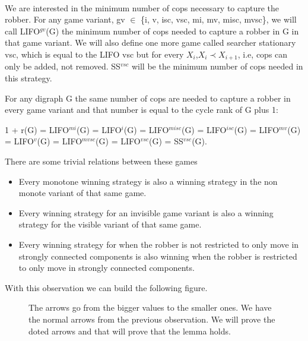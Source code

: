 \paragraph{}
We are interested in the minimum number of cops necessary to capture the robber. For any game variant, gv $\in$ \{i, v, isc, vsc, mi, mv, misc, mvsc\}, we will call LIFO$^{gv}$(G) the minimum number of cops needed to capture a robber in G in that game variant. We will also define one more game called searcher stationary vsc, which is equal to the LIFO vsc but for every $X_i$,$X_i \prec X_{i+1}$, i.e, cops can only be added, not removed. SS$^{vsc}$ will be the minimum number of cops needed in this strategy.

\begin{theorem}
For any digraph G the same number of cops are needed to capture a robber in every game variant and that number is equal to the cycle rank of G plus 1:

1 + r(G) = LIFO$^{mi}$(G) = LIFO$^{i}$(G) = LIFO$^{misc}$(G) = LIFO$^{isc}$(G) = LIFO$^{mv}$(G) = LIFO$^{v}$(G) = LIFO$^{mvsc}$(G) = LIFO$^{vsc}$(G) = SS$^{vsc}$(G).
\end{theorem}
\begin{observation} There are some trivial relations between these games\\
\begin{itemize}
\item Every monotone winning strategy is also a winning strategy in the non monote variant of that same game.
\item Every winning strategy for an invisible game variant is also a winning strategy for the visible variant of that same game.
\item Every winning strategy for when the robber is not restricted to only move in strongly connected components is also winning when the robber is restricted to only move in strongly connected components.
\end{itemize}
\end{observation}

With this observation we can build the following figure.

\begin{figure}[H]

\caption{The arrows go from the bigger values to the smaller ones. We have the normal arrows from the previous observation. We will prove the doted arrows and that will prove that the lemma holds.}
\end{figure}



